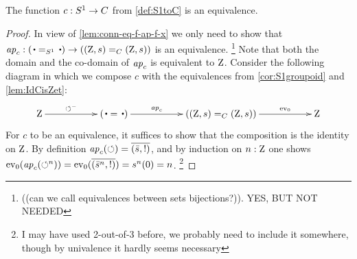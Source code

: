 \begin{theorem}\label{thm:S1bysymmetries}
  The function $c:{S^1}\to C$ from \cref{def:S1toC} is an equivalence.
\end{theorem}
\begin{proof}
  In view of \cref{lem:conn-eq-f-ap-f-x} we only need to show that 
$\ap{c}:(\base=_{\Sc}\base)\to((\zet,s)=_C(\zet,s))$ is an equivalence.
\footnote{ ((can we call equivalences between sets bijections?)). YES, BUT NOT NEEDED}
Note that both the domain and the co-domain of $\mathop{{\it ap}_{c}}$ is equivalent to $\mathrm{Z}$.
Consider the following diagram in which we compose $c$ with the equivalences
from \cref{cor:S1groupoid} and \cref{lem:IdCisZet}:
\[
\xymatrix{
\zet\ar[rr]^-{\Sloop^{{-}}}&&
(\base=\base)\ar[rr]^-{\ap{c}}&&
((\zet,s)=_C(\zet,s))\ar[rr]^-{\ev_0}&&
\zet}
\]
For $c$ to be an equivalence, it suffices to show that the composition
is the identity on $\mathrm{Z}$. By definition $\mathop{{\it ap}_{c}}(\circlearrowleft) = \overline{({\bar {s}},{!})}$, 
and by induction on $n:\mathrm{Z}$
one shows  $\mathrm{ev}_0(\mathop{{\it ap}_{c}}(\circlearrowleft^n))=\mathrm{ev}_0(\overline{({\bar {s}^n},{!})}) = s^n(0) = n$. 
\footnote{I may have used 2-out-of-3 before, we probably need to include it somewhere, though by univalence it hardly seems necessary}%
\end{proof}



